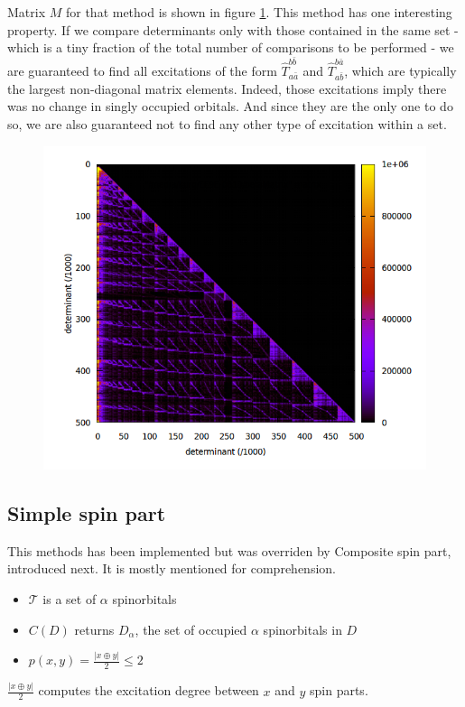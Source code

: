 Matrix $M$ for that method is shown in figure \ref{fig:xor_subspace}.
This method has one interesting property. If we compare determinants only with those contained in the same set - which is a tiny fraction of the total number of comparisons to be performed - we are guaranteed to find all excitations of the form $\hat T_{a \bar a}^{b \bar b}$ and $\hat T_{a \bar b}^{b \bar a}$, which are typically the largest non-diagonal matrix elements. Indeed, those excitations imply there was no change in singly occupied orbitals. And since they are the only one to do so, we are also guaranteed not to find any other type of excitation within a set.

\begin{figure}[H]
	\begin{center}
		\includegraphics[width=0.6\columnwidth]{figures/davidson/xor_subspace}
		\caption{{\label{fig:xor_subspace}
		}}
	\end{center}
\end{figure}


\subsection{Simple spin part}
This methods has been implemented but was overriden by Composite spin part, introduced next. It is mostly mentioned for comprehension.

\begin{itemize}
	\item
$\mathcal{T}$ is a set of $\alpha$ spinorbitals
	\item
$C(D)$ returns $D_\alpha$, the set of occupied $\alpha$ spinorbitals in $D$
	\item
$p(x, y) = \frac{|x \oplus y|}{2} \leq 2$
\end{itemize}

$\frac{|x \oplus y|}{2}$ computes the excitation degree between $x$ and $y$ spin parts. 
    

